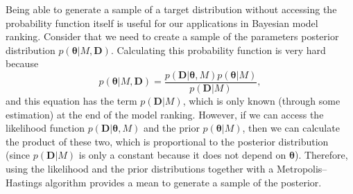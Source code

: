 Being able to generate a sample of a target distribution without 
accessing the probability function itself is useful for our applications
in Bayesian model ranking. Consider that we need to create a sample of
the parameters posterior distribution $p ({\bm \theta} | M, {\bm D})$. 
Calculating this probability function is very hard because
\begin{equation}
  p({\bm \theta} | M, {\bm D}) 
    = \frac{p ({\bm D} | {\bm \theta}, M) p ({\bm \theta} | M)}
      {p ({\bm D}|M)},
\end{equation}
and this equation has the term $p ({\bm D}|M)$, which is only known 
(through some estimation) at the end of the model ranking. However, if 
we can access the likelihood function $p ({\bm D}| {\bm \theta}, M)$ and 
the prior $p ({\bm \theta} | M)$, then we can calculate the product of 
these two, which is proportional to the posterior distribution (since 
$p ({\bm D}|M)$ is only a constant because it does not depend on 
${\bm \theta}$). Therefore, using the likelihood and the prior 
distributions together with a Metropolis--Hastings algorithm provides a 
mean to generate a sample of the posterior.

